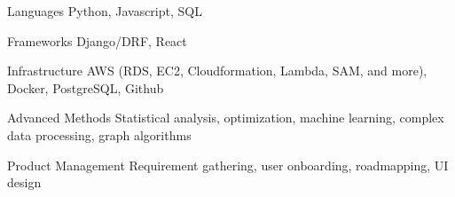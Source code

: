

\begin{cvskills}
  \cvskill
    {Languages}
    {Python, Javascript, SQL}

  \cvskill
    {Frameworks}
    {Django/DRF, React}

  \cvskill
    {Infrastructure}
    {AWS (RDS, EC2, Cloudformation, Lambda, SAM, and more), Docker, PostgreSQL, Github}

  \cvskill
    {Advanced Methods}
    {Statistical analysis, optimization, machine learning, complex data processing, graph algorithms}

  \cvskill
    {Product Management}
    {Requirement gathering, user onboarding, roadmapping, UI design}
\end{cvskills}
